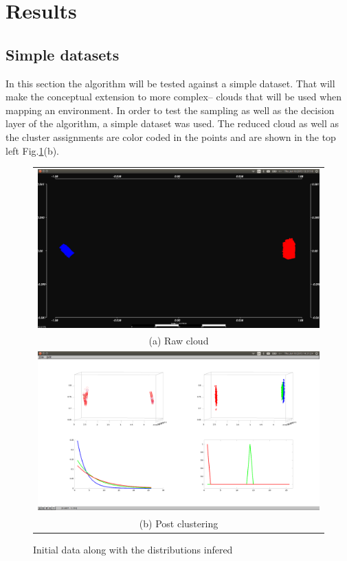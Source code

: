 \documentclass[twoside,hidelinks]{article}
\begin{document}
\section{Results}
\label{sec:results}

\subsection{Simple datasets}

In this section the algorithm will be tested against a simple dataset. That will make the conceptual extension to more complex-- clouds that will be used when mapping an environment. In order to test the sampling as well as the decision layer of the algorithm, a simple dataset was used. The reduced cloud as well as the cluster assignments are color coded in the points and are shown in the top left Fig.\ref{pcl:clust}(b).

\begin{figure}
\begin{tabular}{c}
  \includegraphics[width=1\textwidth]{clusterings/initialData} \\
  (a) Raw cloud  \\
   \includegraphics[width=1\textwidth]{clusterings/colorcodedDistributions} \\
 (b) Post clustering \\[6pt]
\end{tabular}
\caption{Initial data along with the distributions infered}
  \label{pcl:clust}
\end{figure}
\end{document}
